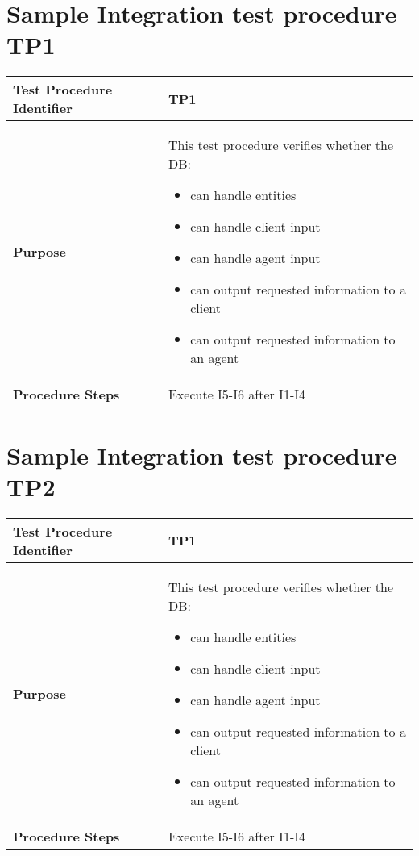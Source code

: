 \section{Sample Integration test procedure TP1} \label{TP1}
\begin{center}
	\vspace{0.6cm}
	\begin{tabular}{|l|p{9cm}|}
		\hline
		\textbf{Test Procedure Identifier} & TP1 \bigstrut \\\hline
		\textbf{Purpose} 
		& This test procedure verifies whether the DB: 
		\begin{itemize} 
			\item can handle entities
			\item can handle client input
			\item can handle agent input
			\item can output requested information to a client
			\item can output requested information to an agent
		\end{itemize} \bigstrut \\\hline
		\textbf{Procedure Steps} & Execute I5-I6 after I1-I4 \bigstrut \\\hline
	\end{tabular}
\end{center}

\section{Sample Integration test procedure TP2} \label{TP2}
\begin{center}
	\vspace{0.6cm}
	\begin{tabular}{|l|p{9cm}|}
		\hline
		\textbf{Test Procedure Identifier} & TP1 \bigstrut \\\hline
		\textbf{Purpose} 
		& This test procedure verifies whether the DB: 
		\begin{itemize} 
			\item can handle entities
			\item can handle client input
			\item can handle agent input
			\item can output requested information to a client
			\item can output requested information to an agent
		\end{itemize} \bigstrut \\\hline
		\textbf{Procedure Steps} & Execute I5-I6 after I1-I4 \bigstrut \\\hline
	\end{tabular}
\end{center}